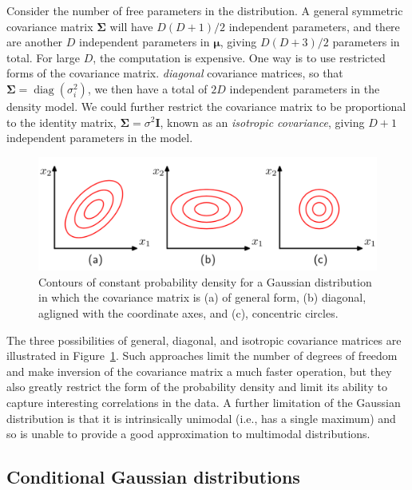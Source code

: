 \documentclass[5p,sort&compress]{elsarticle}
\begin{document}
Consider the number of free parameters in the distribution. A general symmetric covariance matrix $\mathbf{\Sigma}$ will have $D(D+1)/2$ independent parameters, and there are another $D$ independent parameters in $\boldsymbol{\mu}$, giving $D(D+3)/2$ parameters in total. For large $D$, the computation is expensive. One way is to use restricted forms of the covariance matrix. \textit{diagonal} covariance matrices, so that $\mathbf{\Sigma} = \operatorname{diag}(\sigma_i^2)$, we then have a total of $2D$ independent parameters in the density model. We could further restrict the covariance matrix to be proportional to the identity matrix, $\mathbf{\Sigma} = \sigma^2\mathbf{I}$, known as an \textit{isotropic covariance}, giving $D+1$ independent parameters in the model.

\begin{figure}[ht]
     \centering
     \includegraphics[width = \linewidth]{figure/fig2-8.png}
     \caption{Contours of constant probability density for a Gaussian distribution in which the covariance matrix is (a) of general form, (b) diagonal, agligned with the coordinate axes, and (c), concentric circles.}
     \label{fig:2.8}
\end{figure}

The three possibilities of general, diagonal, and isotropic covariance matrices are illustrated in Figure~\ref{fig:2.8}. Such approaches limit the number of degrees of freedom and make inversion of the covariance matrix a much faster operation, but they also greatly restrict the form of the probability density and limit its ability to capture interesting correlations in the data. A further limitation of the Gaussian distribution is that it is intrinsically unimodal (i.e., has a single maximum) and so is unable to provide a good approximation to multimodal distributions.



\subsection{Conditional Gaussian distributions}
\end{document}
